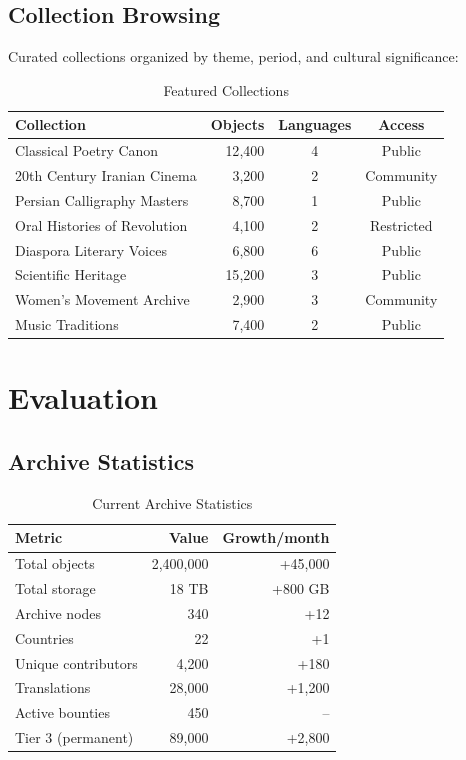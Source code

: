 \documentclass[11pt,a4paper]{article}
\begin{document}
\subsection{Collection Browsing}

Curated collections organized by theme, period, and cultural significance:

\begin{table}[H]
\centering
\caption{Featured Collections}
\label{tab:collections}
\begin{tabular}{lrcc}
\toprule
\textbf{Collection} & \textbf{Objects} & \textbf{Languages} & \textbf{Access} \\
\midrule
Classical Poetry Canon & 12{,}400 & 4 & Public \\
20th Century Iranian Cinema & 3{,}200 & 2 & Community \\
Persian Calligraphy Masters & 8{,}700 & 1 & Public \\
Oral Histories of Revolution & 4{,}100 & 2 & Restricted \\
Diaspora Literary Voices & 6{,}800 & 6 & Public \\
Scientific Heritage & 15{,}200 & 3 & Public \\
Women's Movement Archive & 2{,}900 & 3 & Community \\
Music Traditions & 7{,}400 & 2 & Public \\
\bottomrule
\end{tabular}
\end{table}

\section{Evaluation}

\subsection{Archive Statistics}

\begin{table}[H]
\centering
\caption{Current Archive Statistics}
\label{tab:stats}
\begin{tabular}{lrr}
\toprule
\textbf{Metric} & \textbf{Value} & \textbf{Growth/month} \\
\midrule
Total objects & 2{,}400{,}000 & +45{,}000 \\
Total storage & 18 TB & +800 GB \\
Archive nodes & 340 & +12 \\
Countries & 22 & +1 \\
Unique contributors & 4{,}200 & +180 \\
Translations & 28{,}000 & +1{,}200 \\
Active bounties & 450 & -- \\
Tier 3 (permanent) & 89{,}000 & +2{,}800 \\
\bottomrule
\end{tabular}
\end{table}
\end{document}

